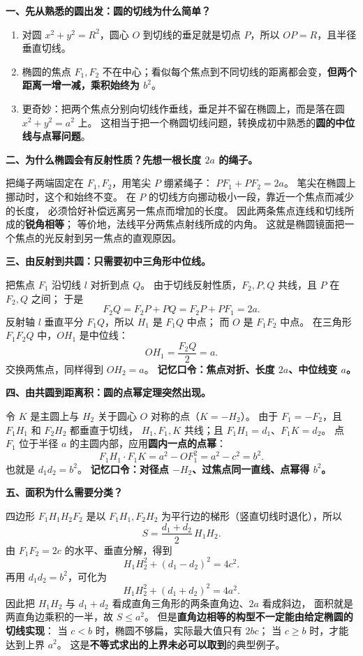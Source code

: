 \begin{explanationbox}
\textbf{一、先从熟悉的圆出发：圆的切线为什么简单？}
\begin{enumerate}
\item 对圆 $x^2+y^2=R^2$，圆心 $O$ 到切线的垂足就是切点 $P$，所以 $OP=R$，且半径垂直切线。
\item 椭圆的焦点 $F_1,F_2$ 不在中心；看似每个焦点到不同切线的距离都会变，\textbf{但两个距离一增一减，乘积始终为 $b^2$}。
\item 更奇妙：把两个焦点分别向切线作垂线，垂足并不留在椭圆上，而是落在圆 $x^2+y^2=a^2$ 上。
这相当于把一个椭圆切线问题，转换成初中熟悉的\textbf{圆的中位线与点幂问题}。
\end{enumerate}

\textbf{二、为什么椭圆会有反射性质？先想一根长度 $2a$ 的绳子。}

把绳子两端固定在 $F_1,F_2$，用笔尖 $P$ 绷紧绳子：
$PF_1+PF_2=2a$。
笔尖在椭圆上挪动时，这个和始终不变。
在 $P$ 的切线方向挪动极小一段，靠近一个焦点而减少的长度，
必须恰好补偿远离另一焦点而增加的长度。
因此两条焦点连线和切线所成的\textbf{锐角相等}；
等价地，法线平分两焦点射线所成的内角。
这就是椭圆镜面把一个焦点的光反射到另一焦点的直观原因。

\textbf{三、由反射到共圆：只需要初中三角形中位线。}

把焦点 $F_1$ 沿切线 $l$ 对折到点 $Q$。
由于切线反射性质，$F_2,P,Q$ 共线，且 $P$ 在 $F_2,Q$ 之间；
于是
\[
F_2Q=F_2P+PQ=F_2P+PF_1=2a.
\]
反射轴 $l$ 垂直平分 $F_1Q$，所以 $H_1$ 是 $F_1Q$ 中点；
而 $O$ 是 $F_1F_2$ 中点。
在三角形 $F_1F_2Q$ 中，$OH_1$ 是中位线：
\[
OH_1=\frac{F_2Q}{2}=a.
\]
交换两焦点，同样得到 $OH_2=a$。
\textbf{记忆口令：焦点对折、长度 $2a$、中位线变 $a$。}

\textbf{四、由共圆到距离积：圆的点幂定理突然出现。}

令 $K$ 是主圆上与 $H_2$ 关于圆心 $O$ 对称的点（$K=-H_2$）。
由于 $F_1=-F_2$，且 $F_1H_1$ 和 $F_2H_2$ 都垂直于切线，
$H_1,F_1,K$ 共线；且 $F_1H_1=d_1$、$F_1K=d_2$。
点 $F_1$ 位于半径 $a$ 的主圆内部，应用\textbf{圆内一点的点幂}：
\[
F_1H_1\cdot F_1K=a^2-OF_1^2=a^2-c^2=b^2.
\]
也就是 $d_1d_2=b^2$。
\textbf{记忆口令：对径点 $-H_2$、过焦点同一直线、点幂得 $b^2$。}

\textbf{五、面积为什么需要分类？}

四边形 $F_1H_1H_2F_2$ 是以 $F_1H_1,F_2H_2$ 为平行边的梯形（竖直切线时退化），所以
\[
S=\frac{d_1+d_2}{2}\,H_1H_2.
\]
由 $F_1F_2=2c$ 的水平、垂直分解，得到
\[
H_1H_2^2+(d_1-d_2)^2=4c^2.
\]
再用 $d_1d_2=b^2$，可化为
\[
\boxed{H_1H_2^2+(d_1+d_2)^2=4a^2}.
\]
因此把 $H_1H_2$ 与 $d_1+d_2$ 看成直角三角形的两条直角边、$2a$ 看成斜边，
面积就是两直角边乘积的一半，故 $S\le a^2$。
但是\textbf{直角边相等的构型不一定能由给定椭圆的切线实现}：
当 $c<b$ 时，椭圆不够扁，实际最大值只有 $2bc$；
当 $c\ge b$ 时，才能达到上界 $a^2$。
这是\textbf{不等式求出的上界未必可以取到}的典型例子。


\end{explanationbox}
